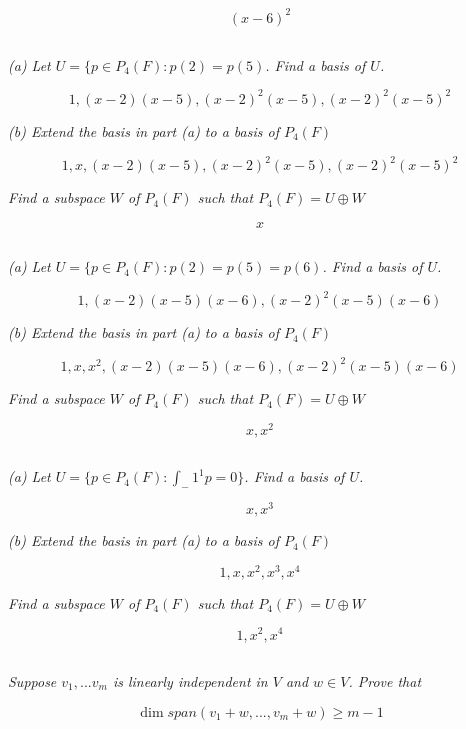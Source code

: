 \documentclass[11pt,oneside,titlepage]{book}
\begin{document}
$$ (x - 6)^2$$


\subsection{}
\textit{(a) Let $U = \{p \in P_4(F): p(2) = p(5)$. Find a basis of $U$.}

$$1, (x - 2)(x - 5), (x - 2)^2(x - 5), (x - 2)^2(x - 5)^2$$

\textit{(b) Extend the basis in part (a) to a basis of $P_4(F)$}

$$1, x, (x - 2)(x - 5), (x - 2)^2(x - 5), (x - 2)^2(x - 5)^2$$

\textit{Find a subspace $W$ of $P_4(F)$ such that $P_4(F) = U \oplus W$}

$$ x $$

\subsection{}
\textit{(a) Let $U = \{p \in P_4(F): p(2) = p(5) = p(6)$. Find a basis of $U$.}

$$1, (x - 2)(x - 5)(x - 6), (x - 2)^2(x - 5)(x - 6)$$

\textit{(b) Extend the basis in part (a) to a basis of $P_4(F)$}

$$1, x, x^2,  (x - 2)(x - 5)(x - 6), (x - 2)^2(x - 5)(x - 6)$$

\textit{Find a subspace $W$ of $P_4(F)$ such that $P_4(F) = U \oplus W$}

$$x, x^2$$

\subsection{}
\textit{(a) Let $U = \{p \in P_4(F): \int_-1^1{p} = 0 \}$.
  Find a basis of $U$.}

$$x, x^3$$

\textit{(b) Extend the basis in part (a) to a basis of $P_4(F)$}

$$1, x, x^2, x^3, x^4$$

\textit{Find a subspace $W$ of $P_4(F)$ such that $P_4(F) = U \oplus W$}

$$1, x^2, x^4$$

\subsection{}
\textit{Suppose $v_1, ... v_m$ is linearly independent in $V$ and $w \in V$.
  Prove that}

$$\dim span(v_1 + w, ..., v_m + w) \geq m - 1$$
\end{document}

